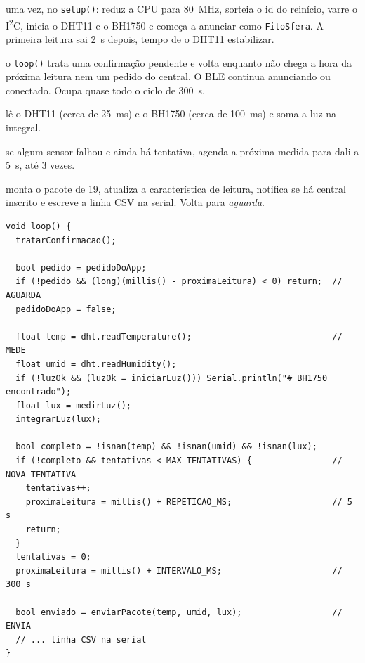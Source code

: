 \begin{description}[style=nextline, leftmargin=1.2cm, font=\normalfont\bfseries]
  \item[inicialização] uma vez, no \texttt{setup()}: reduz a CPU para
    \SI{80}{\mega\hertz}, sorteia o id do reinício, varre o
    I\textsuperscript{2}C, inicia o DHT11 e o BH1750 e começa a anunciar
    como \texttt{FitoSfera}. A primeira leitura sai \SI{2}{\second} depois,
    tempo de o DHT11 estabilizar.
  \item[aguarda] o \texttt{loop()} trata uma confirmação pendente e volta
    enquanto não chega a hora da próxima leitura nem um pedido do central.
    O BLE continua anunciando ou conectado. Ocupa quase todo o ciclo de
    \SI{300}{\second}.
  \item[mede] lê o DHT11 (cerca de \SI{25}{\milli\second}) e o BH1750
    (cerca de \SI{100}{\milli\second}) e soma a luz na integral.
  \item[nova tentativa] se algum sensor falhou e ainda há tentativa,
    agenda a próxima medida para dali a \SI{5}{\second}, até 3 vezes.
  \item[envia] monta o pacote de \SI{19}{\byte}, atualiza a característica
    de leitura, notifica se há central inscrito e escreve a linha CSV na
    serial. Volta para \emph{aguarda}.
\end{description}

\begin{lstlisting}[style=arduino,
  caption={Laço principal de \texttt{firmware/src/main.cpp}: hora marcada, pedido do central e nova tentativa},
  label={lst:laco}]
void loop() {
  tratarConfirmacao();

  bool pedido = pedidoDoApp;
  if (!pedido && (long)(millis() - proximaLeitura) < 0) return;  // AGUARDA
  pedidoDoApp = false;

  float temp = dht.readTemperature();                            // MEDE
  float umid = dht.readHumidity();
  if (!luzOk && (luzOk = iniciarLuz())) Serial.println("# BH1750 encontrado");
  float lux = medirLuz();
  integrarLuz(lux);

  bool completo = !isnan(temp) && !isnan(umid) && !isnan(lux);
  if (!completo && tentativas < MAX_TENTATIVAS) {                // NOVA TENTATIVA
    tentativas++;
    proximaLeitura = millis() + REPETICAO_MS;                    // 5 s
    return;
  }
  tentativas = 0;
  proximaLeitura = millis() + INTERVALO_MS;                      // 300 s

  bool enviado = enviarPacote(temp, umid, lux);                  // ENVIA
  // ... linha CSV na serial
}
\end{lstlisting}

